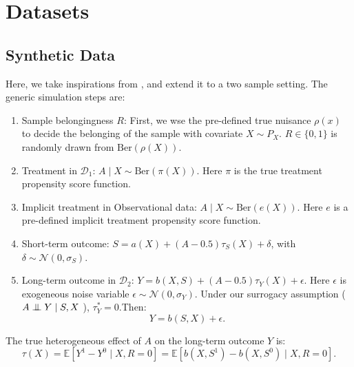 \documentclass{article}
\theoremstyle{plain}
\theoremstyle{definition}
\theoremstyle{remark}
\newcommand{\indep}{\mathrel{\perp\mspace{-10mu}\perp}} %
\newcommand{\E}{\mathbb{E}}                %
\newcommand{\1}{\mathds{1}}                %
\begin{document}
\section{Datasets}
\subsection{Synthetic Data}
\label{app:synthetic}

Here, we take inspirations from \citet{Nie.2021, Morzywolek.2023}, and extend it to a two sample setting. The generic simulation steps are:
\begin{enumerate}
    \item Sample belongingness $R$: First, we wse the pre-defined true nuisance $\rho(x)$ to decide the belonging of the sample with covariate $X\sim P_X$. $R \in \{0,1\}$ is randomly drawn from $\text{Ber}(\rho(X))$. 
    \item Treatment in $\mathcal{D}_1$: $A\mid X \sim \text{Ber}(\pi(X))$. Here $\pi$ is the true treatment propensity score function.
    \item Implicit treatment in Observational data: $A\mid X \sim \text{Ber}(e(X))$. Here $e$ is a pre-defined implicit treatment propensity score function.
    \item Short-term outcome: $S =  a(X) + (A-0.5)\tau_S(X) + \delta$, with $\delta \sim \mathcal{N}(0, \sigma_S)$.
    \item Long-term outcome in $\mathcal{D}_2$: $Y = b(X,S) + (A - 0.5)\tau_Y(X) + \epsilon$. Here $\epsilon$ is exogeneous noise variable $\epsilon \sim \mathcal{N}(0, \sigma_Y)$. Under our surrogacy assumption ($A \indep Y \mid S, X$ ), $\tau_Y^* = 0$.Then:
    \begin{equation}
        Y = b(S,X) + \epsilon.
    \end{equation}
\end{enumerate}
The true heterogeneous effect of $A$ on the long-term outcome $Y$ is:
\begin{equation}
\label{eq:true-cate-simulation}
    \tau(X)=\E \left[Y^1-Y^0\mid X, R=0\right] = \E\left[b(X,S^1) - b(X, S^0) \mid X, R=0\right].
\end{equation}
\end{document}
